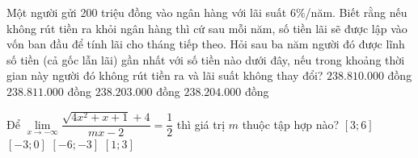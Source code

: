 \begin{ex}%
Một người gửi 200 triệu đồng vào ngân hàng với lãi suất $6\%$/năm. Biết rằng nếu không rút tiền ra khỏi ngân hàng thì cứ sau mỗi năm, số tiền lãi sẽ được lập vào vốn ban đầu để tính lãi cho tháng tiếp theo. Hỏi sau ba năm người đó được lĩnh số tiền (cả gốc lẫn lãi) gần nhất với số tiền nào dưới đây, nếu trong khoảng thời gian này người đó không rút tiền ra và lãi suất không thay đổi?  
\choice
{$238.810.000$ đồng}
{$238.811.000$ đồng}
{\True $238.203.000$ đồng}
{$238.204.000$ đồng}
\end{ex}

\begin{ex}%
Để $\lim\limits_{x\to-\infty}\dfrac{\sqrt{4x^2+x+1}+4}{mx-2}=\dfrac{1}{2}$ thì giá trị $m$ thuộc tập hợp nào?
\choice
{$[3;6]$}
{$[-3;0]$}
{\True $[-6;-3]$}
{$[1;3]$}
\end{ex}

